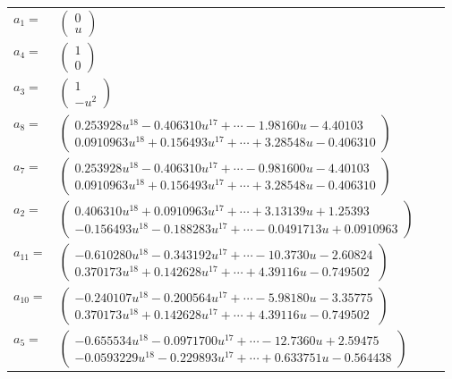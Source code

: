 \documentclass[1p]{elsarticle_modified}
\theoremstyle{definition}
\begin{document}
\begin{tabular}{m{7pt} m{180pt} m{7pt} m{180pt} }
\flushright $a_{1}=$&$\begin{pmatrix}0\\u\end{pmatrix}$ \\
\flushright $a_{4}=$&$\begin{pmatrix}1\\0\end{pmatrix}$ \\
\flushright $a_{3}=$&$\begin{pmatrix}1\\- u^2\end{pmatrix}$ \\
\flushright $a_{8}=$&$\begin{pmatrix}0.253928 u^{18}-0.406310 u^{17}+\cdots-1.98160 u-4.40103\\0.0910963 u^{18}+0.156493 u^{17}+\cdots+3.28548 u-0.406310\end{pmatrix}$ \\
\flushright $a_{7}=$&$\begin{pmatrix}0.253928 u^{18}-0.406310 u^{17}+\cdots-0.981600 u-4.40103\\0.0910963 u^{18}+0.156493 u^{17}+\cdots+3.28548 u-0.406310\end{pmatrix}$ \\
\flushright $a_{2}=$&$\begin{pmatrix}0.406310 u^{18}+0.0910963 u^{17}+\cdots+3.13139 u+1.25393\\-0.156493 u^{18}-0.188283 u^{17}+\cdots-0.0491713 u+0.0910963\end{pmatrix}$ \\
\flushright $a_{11}=$&$\begin{pmatrix}-0.610280 u^{18}-0.343192 u^{17}+\cdots-10.3730 u-2.60824\\0.370173 u^{18}+0.142628 u^{17}+\cdots+4.39116 u-0.749502\end{pmatrix}$ \\
\flushright $a_{10}=$&$\begin{pmatrix}-0.240107 u^{18}-0.200564 u^{17}+\cdots-5.98180 u-3.35775\\0.370173 u^{18}+0.142628 u^{17}+\cdots+4.39116 u-0.749502\end{pmatrix}$ \\
\flushright $a_{5}=$&$\begin{pmatrix}-0.655534 u^{18}-0.0971700 u^{17}+\cdots-12.7360 u+2.59475\\-0.0593229 u^{18}-0.229893 u^{17}+\cdots+0.633751 u-0.564438\end{pmatrix}$ \\

\end{tabular}
\end{document}
